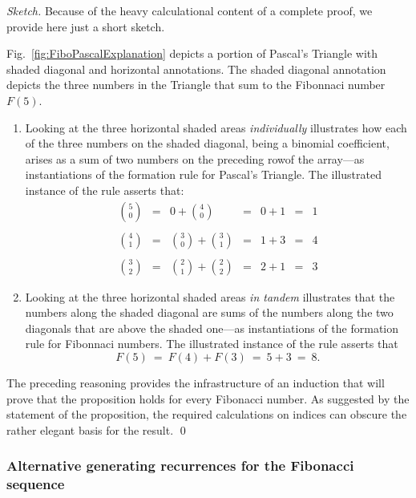 \begin{proof}[Sketch]
Because of the heavy calculational content of a complete proof, we
provide here just a short sketch.

Fig.~\ref{fig:FiboPascalExplanation} depicts a portion of Pascal's
Triangle with shaded diagonal and horizontal annotations.  The shaded
diagonal annotation depicts the three numbers in the Triangle that
sum to the Fibonnaci number $F(5)$.
\begin{enumerate}
\item
Looking at the three horizontal shaded areas {\em individually}
illustrates how each of the three numbers on the shaded diagonal,
being a binomial coefficient, arises as a sum of two numbers on the
preceding rowof the array---as instantiations of the formation rule
for Pascal's Triangle.  The illustrated instance of the rule asserts
that:
\[
\begin{array}{ccccccc}
{\displaystyle {5 \choose 0}}
 & = &
{\displaystyle 0 + {4 \choose 0} }
 & = &
0 + 1
 & = & 1 \\ \\
{\displaystyle {4 \choose 1}}
 & = &
{\displaystyle {3 \choose 0} + {3 \choose 1} }
 & = &
1 + 3
 & = & 4 \\ \\
{\displaystyle {3 \choose 2}}
 & = &
{\displaystyle {2 \choose 1} + {2 \choose 2} }
 & = &
2 + 1
 & = & 3
\end{array}
\]
\item
Looking at the three horizontal shaded areas {\em in tandem}
illustrates that the numbers along the shaded diagonal are sums of the
numbers along the two diagonals that are above the shaded one---as
instantiations of the formation rule for Fibonnaci numbers.  The
illustrated instance of the rule asserts that
\[ F(5) \ = \ F(4) + F(3) \ = \ 5 + 3 \ = \ 8. \]
\end{enumerate}

The preceding reasoning provides the infrastructure of an induction
that will prove that the proposition holds for every Fibonacci
number.  As suggested by the statement of the proposition, the
required calculations on indices can obscure the rather elegant basis
for the result.
\qed
\end{proof}



\subsubsection{Alternative generating recurrences for the Fibonacci sequence}
\label{sec:Fibonacci-other-recurrences}

